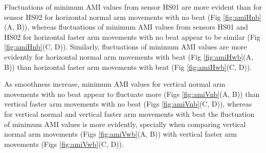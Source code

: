 Fluctuations of minimum AMI values from sensor HS01 are more evident than 
for sensor HS02 for horizontal normal arm movements with no beat 
(Fig \ref{fig:amiHnb}(A, B)),
whereas fluctuations of minimum AMI values from sensors HS01 and HS02 
for horizontal faster arm movements with no beat appear to be similar 
(Fig \ref{fig:amiHnb}(C, D)).
Similarly, fluctuations of minimum AMI values are more evidently for 
horizontal normal arm movements with beat (Fig \ref{fig:amiHwb}(A, B)) than 
horizontal faster arm movements with beat (Fig \ref{fig:amiHwb}(C, D)).

As smoothness increase, minimum AMI values for vertical normal arm movements 
with no beat appear to fluctuate more (Figs \ref{fig:amiVnb}(A, B))
than vertical faster arm movements with no beat (Figs \ref{fig:amiVnb}(C, D)),
whereas for vertical normal and vertical faster arm movements with beat 
the fluctuation of minimum AMI values is more evidently,
specially when comparing vertical normal arm movements 
(Figs \ref{fig:amiVwb}(A, B)) with vertical faster arm movements 
(Figs \ref{fig:amiVwb}(C, D)).

